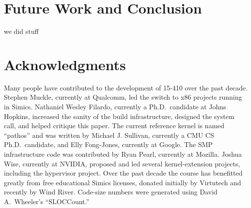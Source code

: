 \section{Future Work and Conclusion}
\label{sec:future}

we did stuff

\section*{Acknowledgments}

Many people have contributed to the development of
15-410 over the past decade.
Stephen Muckle, currently at Qualcomm, led
the switch to x86 projects running in Simics.
Nathaniel Wesley Filardo,
currently a Ph.D.\ candidate at Johns Hopkins,
increased the sanity of the build infrastructure,
designed the  system call, and helped critique this paper.
The current reference kernel is named ``pathos''
and was written by Michael J. Sullivan,
currently a CMU CS Ph.D.\ candidate,
and Elly Fong-Jones, currently at Google.
The SMP infrastructure code was contributed by
Ryan Pearl, currently at Mozilla.
Joshua Wise, currently at NVIDIA,
proposed and led several kernel-extension projects,
including the hypervisor project.
Over the past decade the course has benefitted
greatly from free educational Simics licenses,
donated initially by Virtutech and recently by
Wind River.
Code-size numbers were generated using David A.\ Wheeler's
``SLOCCount.''

